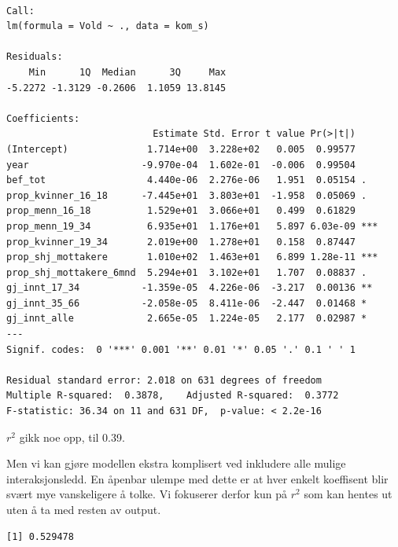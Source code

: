 \documentclass[
  letterpaper,
  DIV=11,
  numbers=noendperiod]{scrreprt}
\newenvironment{Shaded}{\begin{snugshade}}{\end{snugshade}}
\newcommand{\AttributeTok}[1]{\textcolor[rgb]{0.40,0.45,0.13}{#1}}
\newcommand{\DecValTok}[1]{\textcolor[rgb]{0.68,0.00,0.00}{#1}}
\newcommand{\FunctionTok}[1]{\textcolor[rgb]{0.28,0.35,0.67}{#1}}
\newcommand{\NormalTok}[1]{\textcolor[rgb]{0.00,0.23,0.31}{#1}}
\newcommand{\OtherTok}[1]{\textcolor[rgb]{0.00,0.23,0.31}{#1}}
\newcommand{\SpecialCharTok}[1]{\textcolor[rgb]{0.37,0.37,0.37}{#1}}
\theoremstyle{definition}
\theoremstyle{remark}
\begin{document}
\begin{verbatim}

Call:
lm(formula = Vold ~ ., data = kom_s)

Residuals:
    Min      1Q  Median      3Q     Max 
-5.2272 -1.3129 -0.2606  1.1059 13.8145 

Coefficients:
                          Estimate Std. Error t value Pr(>|t|)    
(Intercept)              1.714e+00  3.228e+02   0.005  0.99577    
year                    -9.970e-04  1.602e-01  -0.006  0.99504    
bef_tot                  4.440e-06  2.276e-06   1.951  0.05154 .  
prop_kvinner_16_18      -7.445e+01  3.803e+01  -1.958  0.05069 .  
prop_menn_16_18          1.529e+01  3.066e+01   0.499  0.61829    
prop_menn_19_34          6.935e+01  1.176e+01   5.897 6.03e-09 ***
prop_kvinner_19_34       2.019e+00  1.278e+01   0.158  0.87447    
prop_shj_mottakere       1.010e+02  1.463e+01   6.899 1.28e-11 ***
prop_shj_mottakere_6mnd  5.294e+01  3.102e+01   1.707  0.08837 .  
gj_innt_17_34           -1.359e-05  4.226e-06  -3.217  0.00136 ** 
gj_innt_35_66           -2.058e-05  8.411e-06  -2.447  0.01468 *  
gj_innt_alle             2.665e-05  1.224e-05   2.177  0.02987 *  
---
Signif. codes:  0 '***' 0.001 '**' 0.01 '*' 0.05 '.' 0.1 ' ' 1

Residual standard error: 2.018 on 631 degrees of freedom
Multiple R-squared:  0.3878,    Adjusted R-squared:  0.3772 
F-statistic: 36.34 on 11 and 631 DF,  p-value: < 2.2e-16
\end{verbatim}

\(r^2\) gikk noe opp, til 0.39.

Men vi kan gjøre modellen ekstra komplisert ved inkludere alle mulige
interaksjonsledd. En åpenbar ulempe med dette er at hver enkelt
koeffisent blir svært mye vanskeligere å tolke. Vi fokuserer derfor kun
på \(r^2\) som kan hentes ut uten å ta med resten av output.

\begin{Shaded}
\end{Shaded}

\begin{verbatim}
[1] 0.529478
\end{verbatim}
\end{document}
